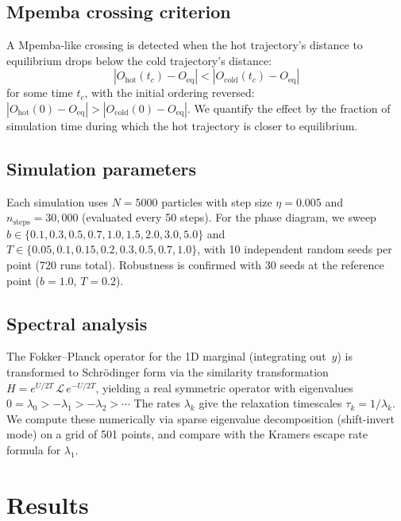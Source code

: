 \documentclass[aps,pre,reprint,superscriptaddress,showpacs]{revtex4-2}
\begin{document}
\subsection{Mpemba crossing criterion}

A Mpemba-like crossing is detected when the hot trajectory's distance to
equilibrium drops below the cold trajectory's distance:
\begin{equation}
|O_\mathrm{hot}(t_c) - O_\mathrm{eq}| < |O_\mathrm{cold}(t_c) - O_\mathrm{eq}|
\end{equation}
for some time $t_c$, with the initial ordering reversed:
$|O_\mathrm{hot}(0) - O_\mathrm{eq}| > |O_\mathrm{cold}(0) - O_\mathrm{eq}|$.
We quantify the effect by the fraction of simulation time during which the hot
trajectory is closer to equilibrium.

\subsection{Simulation parameters}

Each simulation uses $N = 5000$ particles with step size $\eta = 0.005$ and
$n_\mathrm{steps} = 30{,}000$ (evaluated every 50 steps). For the phase
diagram, we sweep $b \in \{0.1, 0.3, 0.5, 0.7, 1.0, 1.5, 2.0, 3.0, 5.0\}$
and $T \in \{0.05, 0.1, 0.15, 0.2, 0.3, 0.5, 0.7, 1.0\}$, with 10
independent random seeds per point (720 runs total). Robustness is confirmed
with 30 seeds at the reference point ($b=1.0$, $T=0.2$).

\subsection{Spectral analysis}

The Fokker--Planck operator for the 1D marginal (integrating out~$y$) is
transformed to Schr\"odinger form via the similarity transformation
$H = e^{U/2T}\,\mathcal{L}\,e^{-U/2T}$, yielding a real symmetric operator
with eigenvalues $0 = \lambda_0 > -\lambda_1 > -\lambda_2 > \cdots$ The rates
$\lambda_k$ give the relaxation timescales $\tau_k = 1/\lambda_k$. We compute
these numerically via sparse eigenvalue decomposition (shift-invert mode) on a
grid of 501 points, and compare with the Kramers escape rate formula for
$\lambda_1$.

\section{Results}
\end{document}
